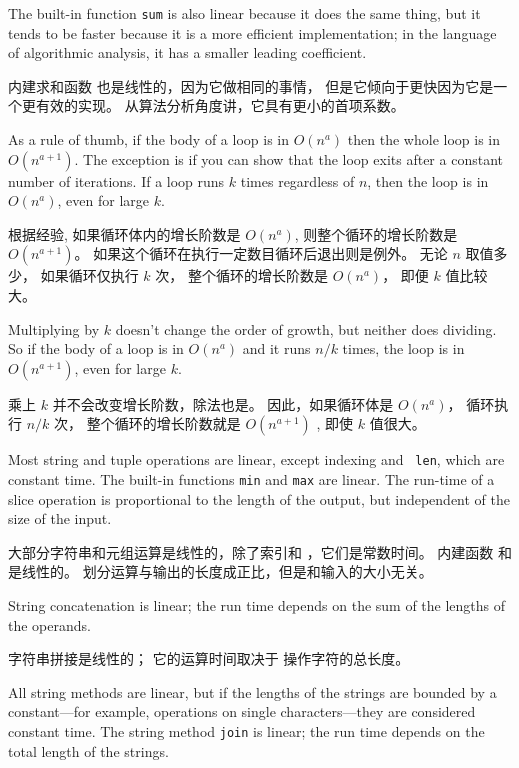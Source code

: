 The built-in function {\tt sum} is also linear because it does
the same thing, but it tends to be faster because it is a more
efficient implementation; in the language of algorithmic analysis,
it has a smaller leading coefficient.

内建求和函数  也是线性的，因为它做相同的事情，
但是它倾向于更快因为它是一个更有效的实现。
从算法分析角度讲，它具有更小的首项系数。

As a rule of thumb, if the body of a loop is in $O(n^a)$ then
the whole loop is in $O(n^{a+1})$.  The exception is if you can
show that the loop exits after a constant number of iterations.
If a loop runs $k$ times regardless of $n$, then
the loop is in $O(n^a)$, even for large $k$.

根据经验, 如果循环体内的增长阶数是 $O(n^a)$, 则整个循环的增长阶数是 $O(n^{a+1})$。  
如果这个循环在执行一定数目循环后退出则是例外。 无论 $n$ 取值多少， 如果循环仅执行 $k$ 次， 整个循环的增长阶数是 $O(n^a)$， 即便 $k$ 值比较大。

Multiplying by $k$ doesn't change the order of growth, but neither
does dividing.  So if the body of a loop is in $O(n^a)$ and it runs
$n/k$ times, the loop is in $O(n^{a+1})$, even for large $k$.

乘上 $k$ 并不会改变增长阶数，除法也是。 因此，如果循环体是 $O(n^a)$， 循环执行 $n/k$ 次， 整个循环的增长阶数就是 $O(n^{a+1})$ , 即使 $k$ 值很大。

Most string and tuple operations are linear, except indexing and {\tt
  len}, which are constant time.  The built-in functions {\tt min} and
{\tt max} are linear.  The run-time of a slice operation is
proportional to the length of the output, but independent of the size
of the input.

大部分字符串和元组运算是线性的，除了索引和 ，它们是常数时间。
内建函数  和  是线性的。
划分运算与输出的长度成正比，但是和输入的大小无关。
  
  

String concatenation is linear; the run time depends on the sum
of the lengths of the operands.

字符串拼接是线性的； 它的运算时间取决于 操作字符的总长度。

All string methods are linear, but if the lengths of
the strings are bounded by a constant---for example, operations on single
characters---they are considered constant time.
The string method {\tt join} is linear; the run time depends on
the total length of the strings.

